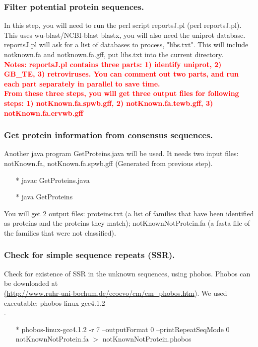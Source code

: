 \documentclass[12pt]{article}
\begin{document}
\subsubsection{Filter potential protein sequences.}
In this step, you will need to run the perl script reportsJ.pl (perl reportsJ.pl). This uses wu-blast/NCBI-blast blastx, you will also need the uniprot database. reportsJ.pl will ask for a list of databases to process, "libs.txt". This will include notknown.fa and notknown.fa.gff, put libs.txt into the current directory. \\

\noindent\textbf{\textcolor{red}{Notes: reportsJ.pl contains three parts: 1) identify uniprot, 2) GB\_TE, 3) retroviruses. You can comment out two parts, and run each part separately in parallel to save time. \\
		From these three steps, you will get three output files for following steps: 1) notKnown.fa.spwb.gff, 2) notKnown.fa.tewb.gff, 3) notKnown.fa.ervwb.gff}} 

\subsubsection{Get protein information from consensus sequences.}
Another java program GetProteins.java will be used. It needs two input files: notKnown.fa, notKnown.fa.spwb.gff (Generated from previous step).
\begin{enumerate}
	\item[*] javac GetProteins.java
	\item[*] java GetProteins
\end{enumerate}
You will get 2 output files: proteins.txt (a list of families that have been identified as proteins and the proteins they match);
notKnownNotProtein.fa (a fasta file of the families that were not classified).

\subsubsection{Check for simple sequence repeats (SSR).}
Check for existence of SSR in the unknown sequences, using phobos. Phobos can be downloaded at \\ \href{<url>}(\url{http://www.ruhr-uni-bochum.de/ecoevo/cm/cm_phobos.htm}). We used executable: phobos-linux-gcc4.1.2\\
.
\begin{enumerate}
	\item[*] phobos-linux-gcc4.1.2 -r 7 --outputFormat 0 --printRepeatSeqMode 0 notKnownNotProtein.fa $>$ notKnownNotProtein.phobos
\end{enumerate}
\end{document}
